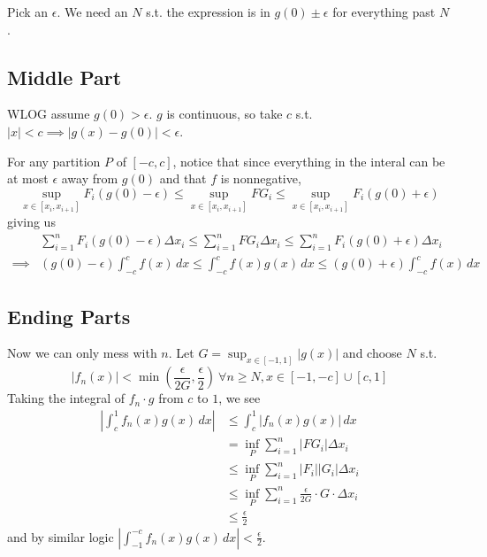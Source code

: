 \documentclass[12pt]{article}
\begin{document}
Pick an $\epsilon$.
We need an $N$ s.t. the expression is in $g(0) \pm \epsilon$ for everything past $N$.

\subsection{Middle Part}

WLOG assume $g(0) > \epsilon$.
$g$ is continuous, so take $c$ s.t. $|x| < c \implies |g(x)-g(0)| < \epsilon$.

For any partition $P$ of $[-c, c]$, notice that since everything in the
interal can be at most $\epsilon$ away from $g(0)$ and that $f$ is nonnegative,
\[\sup_{x \in [x_i, x_{i+1}]} F_i(g(0)-\epsilon) \le \sup_{x \in [x_i, x_{i+1}]} FG_i \le \sup_{x \in [x_i, x_{i+1}]} F_i(g(0)+\epsilon)\]
giving us
\begin{align*}
             & \sum_{i=1}^{n} F_i(g(0)-\epsilon)\Delta x_i \le \sum_{i=1}^{n} FG_i \Delta x_i \le \sum_{i=1}^{n} F_i(g(0)+\epsilon)\Delta x_i \\
  \implies{} & (g(0)-\epsilon) \int_{-c}^{c} f(x)\,dx \le \int_{-c}^{c} f(x)g(x)\,dx \le (g(0)+\epsilon) \int_{-c}^{c} f(x)\,dx
\end{align*}

\pagebreak

\subsection{Ending Parts}

Now we can only mess with $n$.
Let $G=\sup_{x \in [-1, 1]} |g(x)|$ and choose $N$ s.t.
\[|f_n(x)| < \min\left(\frac{\epsilon}{2G}, \frac{\epsilon}{2}\right)\ \forall n \ge N, x \in [-1, -c] \cup [c, 1]\]
Taking the integral of $f_n \cdot g$ from $c$ to $1$, we see
\begin{align*}
  \left|\int_{c}^{1} f_n(x)g(x)\,dx\right|
   & \le \int_{c}^{1} |f_n(x)g(x)|\,dx                                      \\
   & = \inf_P \sum_{i=1}^{n} |FG_i| \Delta x_i                              \\
   & \le \inf_P \sum_{i=1}^{n} |F_i||G_i| \Delta x_i                        \\
   & \le \inf_P \sum_{i=1}^{n} \frac{\epsilon}{2G} \cdot G \cdot \Delta x_i \\
   & \le \frac{\epsilon}{2}
\end{align*}
and by similar logic $\left|\int_{-1}^{-c} f_n(x)g(x)\,dx\right| < \frac{\epsilon}{2}$.
\end{document}
